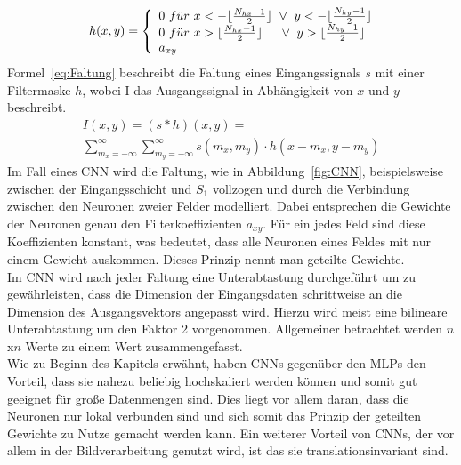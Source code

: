 \documentclass[times, 11pt,twocolumn]{article}
\begin{document}
\begin{equation} 
	h(x,y) = \left\lbrace
  \begin{array}{l@{}l}
   0~f\ddot{u}r~x<-\lfloor\frac{N_{hx}-1}{2}\rfloor~\vee~y<-\lfloor\frac{N_{hy}-1}{2}\rfloor\\
    0~f\ddot{u}r~x>\lfloor\frac{N_{hx}-1}{2}\rfloor~~~~\vee~y>\lfloor\frac{N_{hy}-1}{2}\rfloor \\
    a_{xy}
  \end{array}
  \right.	
	\label{eq:Filtermaske}
\end{equation}
\small  
Formel~\ref{eq:Faltung} beschreibt die Faltung eines Eingangssignals $s$ mit einer Filtermaske $h$, wobei I das Ausgangssignal in Abhängigkeit von $x$ und $y$ beschreibt.
\footnotesize
\begin{equation}
\begin{aligned}
I(x,y) = (s*h)(x,y) = \\
\sum_{m_x=-\infty}^\infty \sum_{m_y=-\infty}^\infty s(m_x,m_y) \cdot h(x-m_x,y-m_y) 
\end{aligned}
	\label{eq:Faltung}
\end{equation}
\small
Im Fall eines CNN wird die Faltung, wie in Abbildung~\ref{fig:CNN}, beispielsweise zwischen der Eingangsschicht und $S_1$ vollzogen und durch die Verbindung zwischen den Neuronen zweier Felder modelliert. Dabei entsprechen die Gewichte der Neuronen genau den Filterkoeffizienten $a_{xy}$. Für ein jedes Feld sind diese Koeffizienten konstant, was bedeutet, dass alle Neuronen eines Feldes mit nur einem Gewicht auskommen. Dieses Prinzip nennt man geteilte Gewichte. \\
Im CNN wird nach jeder Faltung eine Unterabtastung durchgeführt um zu gewährleisten, dass die Dimension der Eingangsdaten schrittweise an die Dimension des Ausgangsvektors angepasst wird. Hierzu wird meist eine bilineare Unterabtastung um den Faktor 2 vorgenommen. Allgemeiner betrachtet werden $n$x$n$ Werte zu einem Wert zusammengefasst.\\
Wie zu Beginn des Kapitels erwähnt, haben CNNs gegenüber den MLPs den Vorteil, dass sie nahezu beliebig hochskaliert werden können und somit gut geeignet für große Datenmengen sind. Dies liegt vor allem daran, dass die Neuronen nur lokal verbunden sind und sich somit das Prinzip der geteilten Gewichte zu Nutze gemacht werden kann. Ein weiterer Vorteil von CNNs, der vor allem in der Bildverarbeitung genutzt wird, ist das sie translationsinvariant sind.
\end{document}
